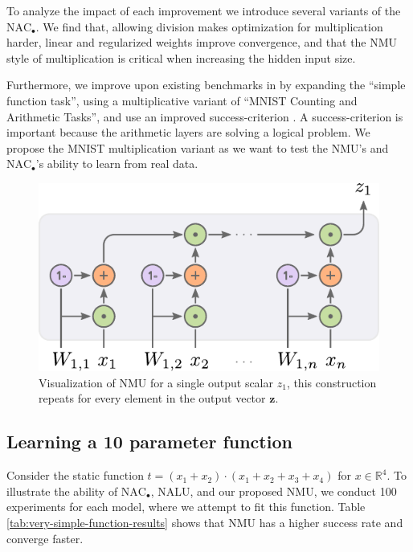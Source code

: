 To analyze the impact of each improvement we introduce several variants of the $\text{NAC}_{\bullet}$.
We find that, allowing division makes optimization for multiplication harder, linear and regularized weights improve convergence, and that the NMU style of multiplication is critical when increasing the hidden input size.

Furthermore, we improve upon existing benchmarks in \citet{trask-nalu} by expanding the ``simple function task'', using a multiplicative variant of ``MNIST Counting and Arithmetic Tasks'', and use an improved success-criterion \citet{maep-madsen-johansen-2019}.
A success-criterion is important because the arithmetic layers are solving a logical problem.
We propose the MNIST multiplication variant as we want to test the NMU's and $\text{NAC}_{\bullet}$'s ability to learn from real data.

\begin{figure}[t]
\centering
\includegraphics[scale=0.7]{graphics/nmu.pdf}
\caption{Visualization of NMU for a single output scalar $z_1$, this construction repeats for every element in the output vector $\mathbf{z}$.}
\end{figure}

\subsection{Learning a 10 parameter function}
Consider the static function $t = (x_1 + x_2) \cdot (x_1 + x_2 + x_3 + x_4)$ for $x \in \mathbb{R}^4$. To illustrate the ability of $\mathrm{NAC}_{\bullet}$, NALU, and our proposed NMU, we conduct 100 experiments for each model, where we attempt to fit this function. Table \ref{tab:very-simple-function-results} shows that NMU has a higher success rate and converge faster.

